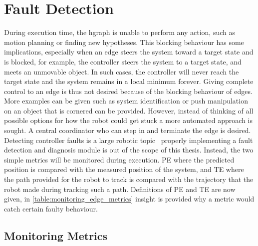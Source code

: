 \section{Fault Detection}%
\label{sec:fault_detection}
During execution time, the \ac{hgraph} is unable to perform any action, such as motion planning or finding new hypotheses. This blocking behaviour has some implications, especially when an edge steers the system toward a target state and is blocked, for example, the controller steers the system to a target state, and meets an unmovable object. In such cases, the controller will never reach the target state and the system remains in a local minimum forever. Giving complete control to an edge is thus not desired because of the blocking behaviour of edges. More examples can be given such as system identification or push manipulation on an object that is cornered can be provided. However, instead of thinking of all possible options for how the robot could get stuck a more automated approach is sought.  A central coordinator who can step in and terminate the edge is desired. Detecting controller faults is a large robotic topic~\cite{khalastchi_fault_2019} properly implementing a fault detection and diagnosis module is out of the scope of this thesis. Instead, the two simple metrics will be monitored during execution. \ac{PE} where the predicted position is compared with the measured position of the system, and \ac{TE} where the path provided for the robot to track is compared with the trajectory that the robot made during tracking such a path. Definitions of \ac{PE} and \ac{TE} are now given, in \cref{table:monitoring_edge_metrics} insight is provided why a metric would catch certain faulty behaviour.

\subsection{Monitoring Metrics}

